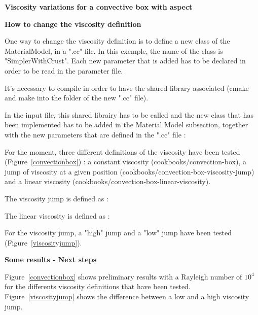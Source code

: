 \documentclass{article}
\begin{document}
\begin{center}
\textbf{\large{Viscosity variations for a convective box with aspect}}
\end{center}

\vspace{0.2cm}
\textbf{How to change the viscosity definition}
\vspace{0.2cm}

One way to change the viscosity definition is to define a new class of the MaterialModel, in a ".cc" file. In this exemple, the name of the class is "SimplerWithCrust". Each new parameter that is added has to be declared in order to be read in the parameter file. 

It's necessary to compile in order to have the shared library associated (cmake and make into the folder of the new ".cc" file).

In the input file, this shared librairy has to be called and the new class that has been implemented has to be added in the Material Model subsection, together with  the new parameters that are defined in the ".cc" file :



For the moment, three different definitions of the viscosity have been tested (Figure~\ref{convectionbox}) : a constant viscosity (cookbooks/convection-box), a jump of viscosity at a given position (cookbooks/convection-box-viscosity-jump) and a linear viscosity (cookbooks/convection-box-linear-viscosity).

The viscosity jump is defined as :



The linear viscosity is defined as :



For the viscosity jump, a "high" jump and a "low" jump have been tested (Figure~\ref{viscosityjump}).

\vspace{0.2cm}
\textbf{Some results - Next steps}
\vspace{0.2cm}

Figure~\ref{convectionbox} shows preliminary results with a Rayleigh number of $10^4$ for the differents viscosity definitions that have been tested. Figure~\ref{viscosityjump} shows the difference between a low and a high viscosity jump.
\end{document}
